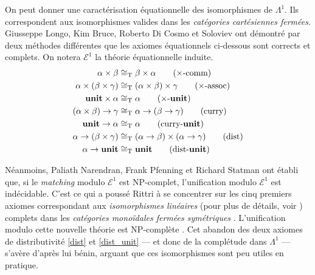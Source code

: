 \documentclass[a4paper]{report}
\theoremstyle{definition}
\newcommand{\unit}{\bold{unit}}
\newcommand{\E}{\mathscr{E}}
\newcommand{\T}{\mathrm{T}}
\begin{document}
On peut donner une caractérisation équationnelle des isomorphismes de $\Lambda^1$. Ils correspondent aux isomorphismes valides dans les \emph{catégories cartésiennes fermées}. Giusseppe Longo, Kim Bruce, Roberto Di Cosmo \cite{Bruce_DiCosmo_Longo} et Soloviev \cite{Soloviev83} ont démontré par deux méthodes différentes que les axiomes équationnels ci-dessous sont corrects et complets. On notera $\E^1$ la théorie équationnelle induite.
\begin{align}
    \alpha \times \beta &\cong_\T
    \beta \times \alpha
    \label{prod_comm}
    \tag{$\times$-comm}
  \\
    \alpha \times (\beta \times \gamma) &\cong_\T
    (\alpha \times \beta) \times \gamma
    \label{prod_assoc}
    \tag{$\times$-assoc}
  \\
    \unit \times \alpha &\cong_\T
    \alpha
    \label{prod_unit}
    \tag{$\times$-$\unit$}
  \\
    (\alpha \times \beta) \rightarrow \gamma &\cong_\T
    \alpha \rightarrow (\beta \rightarrow \gamma)
    \label{curry}
    \tag{curry}
  \\
    \unit \rightarrow \alpha &\cong_\T
    \alpha
    \label{curry_unit}
    \tag{curry-$\unit$}
  \\
    \alpha \rightarrow (\beta \times \gamma) &\cong_\T
    (\alpha \rightarrow \beta) \times (\alpha \rightarrow \gamma)
    \label{dist}
    \tag{dist}
  \\
    \alpha \rightarrow \unit &\cong_\T
    \unit
    \label{dist_unit}
    \tag{dist-$\unit$}
\end{align}

Néanmoins, Paliath Narendran, Frank Pfenning et Richard Statman \cite{Narendran_Pfenning_Statman} ont établi que, si le \emph{matching} modulo $\E^1$ est NP-complet, l'unification modulo $\E^1$ est indécidable. C'est ce qui a poussé Rittri \cite{Rittri93} à se concentrer sur les cinq premiers axiomes correspondant aux \emph{isomorphismes linéaires} (pour plus de détails, voir \cite{Rittri93}) complets dans les \emph{catégories monoïdales fermées symétriques} \cite{Soloviev93}. L'unification modulo cette nouvelle théorie est NP-complète \cite{Narendran_Pfenning_Statman}. Cet abandon des deux axiomes de distributivité \eqref{dist} et \eqref{dist_unit} — et donc de la complétude dans $\Lambda^1$ — s'avère d'après lui bénin, arguant que ces isomorphismes sont peu utiles en pratique.

\end{document}
